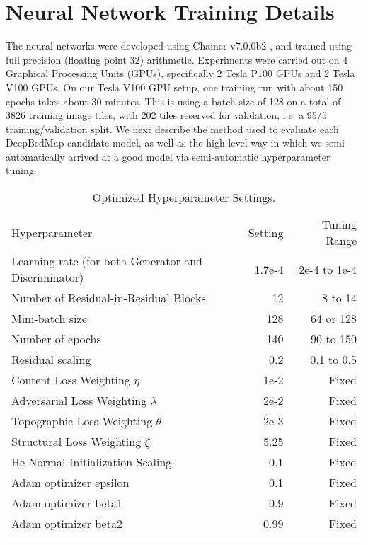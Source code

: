 \documentclass[tc, manuscript]{copernicus}
\begin{document}
\section{Neural Network Training Details} \label{appendix:B}

The neural networks were developed using Chainer v7.0.0b2 \citep{TokuiChainerDeepLearning2019}, and trained using full precision (floating point 32) arithmetic.
Experiments were carried out on 4 Graphical Processing Units (GPUs), specifically 2 Tesla P100 GPUs and 2 Tesla V100 GPUs.
On our Tesla V100 GPU setup, one training run with about 150 epochs takes about 30 minutes.
This is using a batch size of 128 on a total of 3826 training image tiles, with 202 tiles reserved for validation, i.e. a 95/5 training/validation split.
We next describe the method used to evaluate each DeepBedMap candidate model, as well as the high-level way in which we semi-automatically arrived at a good model via semi-automatic hyperparameter tuning.

\begin{table*}[htbp]
  \caption{Optimized Hyperparameter Settings.}
  \label{table:B1}
  \begin{tabular}{lrr}
  \tophline
  Hyperparameter & Setting & Tuning Range \\
  \middlehline
  Learning rate (for both Generator and Discriminator) & 1.7e-4 & 2e-4 to 1e-4 \\
  Number of Residual-in-Residual Blocks & 12 & 8 to 14 \\
  Mini-batch size & 128 & 64 or 128 \\
  Number of epochs & 140 & 90 to 150 \\
  Residual scaling & 0.2 & 0.1 to 0.5 \\
  Content Loss Weighting $\eta$ & 1e-2 & Fixed \\
  Adversarial Loss Weighting $\lambda$ & 2e-2 & Fixed \\
  Topographic Loss Weighting $\theta$ & 2e-3 & Fixed \\
  Structural Loss Weighting $\zeta$ & 5.25 & Fixed \\
  He Normal Initialization Scaling & 0.1 & Fixed \\
  Adam optimizer epsilon & 0.1 & Fixed \\
  Adam optimizer beta1 & 0.9 & Fixed \\
  Adam optimizer beta2 & 0.99 & Fixed \\
  \bottomhline
  \end{tabular}
  \belowtable{} %
\end{table*}
\end{document}
